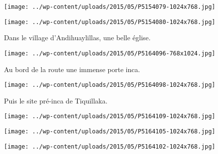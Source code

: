 \begin{center} \texttt{[image: ../wp-content/uploads/2015/05/P5154079-1024x768.jpg]} \end{center}
\vfill
\begin{center} \texttt{[image: ../wp-content/uploads/2015/05/P5154080-1024x768.jpg]} \end{center}
\vspace{-\topsep}
\vspace{-0.75mm}
\pagebreak

Dans le village d'Andihuaylillas, une belle église. 
\begin{center} \texttt{[image: ../wp-content/uploads/2015/05/P5164096-768x1024.jpg]} \end{center}

Au bord de la route une immense porte inca. 
\begin{center} \texttt{[image: ../wp-content/uploads/2015/05/P5164098-1024x768.jpg]} \end{center}
\vspace{-\topsep}
\pagebreak

Puis le site pré-inca de Tiquillaka. 
\begin{center} \texttt{[image: ../wp-content/uploads/2015/05/P5164109-1024x768.jpg]} \end{center}
\begin{center} \texttt{[image: ../wp-content/uploads/2015/05/P5164105-1024x768.jpg]} \end{center}
\begin{center} \texttt{[image: ../wp-content/uploads/2015/05/P5164102-1024x768.jpg]} \end{center}
